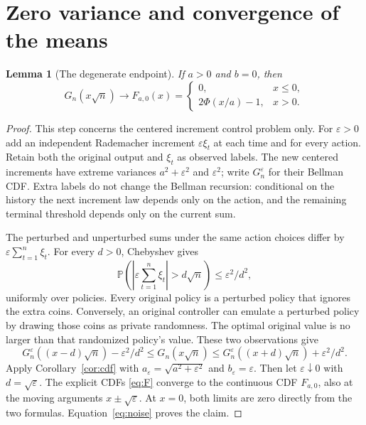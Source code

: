 \documentclass[11pt,a4paper]{article}
\newtheorem{lemma}[theorem]{Lemma}
\newcommand{\Prob}{\mathbb P}
\begin{document}
\section{Zero variance and convergence of the means}
\begin{lemma}[The degenerate endpoint]\label{lem:zero}
If $a>0$ and $b=0$, then
\[
G_n(x\sqrt n)\longrightarrow F_{a,0}(x)
=\begin{cases}0,&x\le0,\\2\Phi(x/a)-1,&x>0.\end{cases}
\]
\end{lemma}
\begin{proof}
This step concerns the centered increment control problem only.
For $\varepsilon>0$ add an independent Rademacher increment
$\varepsilon\xi_t$ at each time and for every action. Retain both the
original output and $\xi_t$ as observed labels. The new centered
increments have extreme variances $a^2+\varepsilon^2$ and $\varepsilon^2$;
write $G_n^\varepsilon$ for their Bellman CDF.
Extra labels do not change the Bellman recursion: conditional on the
history the next increment law depends only on the action, and the
remaining terminal threshold depends only on the current sum.

The perturbed and unperturbed sums under the same action choices differ
by $\varepsilon\sum_{t=1}^n\xi_t$. For every $d>0$, Chebyshev gives
\[
\Prob\left(\left|\varepsilon\sum_{t=1}^n\xi_t\right|>d\sqrt n\right)
\le\varepsilon^2/d^2,
\]
uniformly over policies. Every original policy is a perturbed policy
that ignores the extra coins. Conversely, an original controller can
emulate a perturbed policy by drawing those coins as private randomness.
The optimal original value is no larger than that randomized policy's
value. These two observations give
\begin{equation}\label{eq:noise}
G_n^\varepsilon((x-d)\sqrt n)-\varepsilon^2/d^2
\le G_n(x\sqrt n)
\le G_n^\varepsilon((x+d)\sqrt n)+\varepsilon^2/d^2.
\end{equation}
Apply Corollary~\ref{cor:cdf} with
$a_\varepsilon=\sqrt{a^2+\varepsilon^2}$ and $b_\varepsilon=\varepsilon$.
Then let $\varepsilon\downarrow0$ with $d=\sqrt\varepsilon$.
The explicit CDFs \eqref{eq:F} converge to the continuous CDF $F_{a,0}$,
also at the moving arguments $x\pm\sqrt\varepsilon$. At $x=0$, both
limits are zero directly from the two formulas. Equation~\eqref{eq:noise}
proves the claim.
\end{proof}
\end{document}
